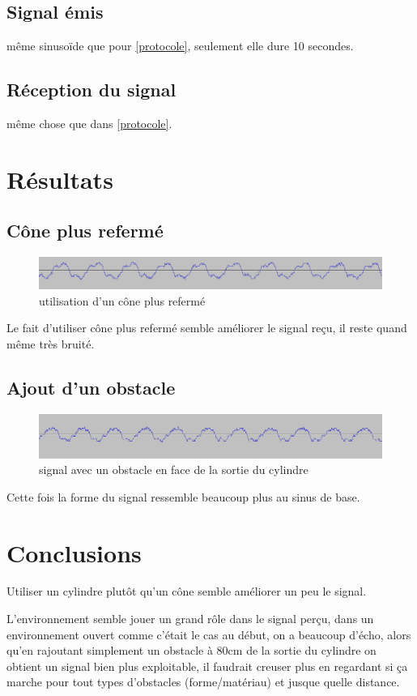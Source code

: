 \subsection{Signal émis}
même sinusoïde que pour \ref{protocole}, seulement elle dure 10 secondes.

\subsection{Réception du signal}
même chose que dans \ref{protocole}.

\section{Résultats}
\subsection{Cône plus refermé}
\begin{figure}[H]
\includegraphics[width=\textwidth]{resources/img/cone_90_plus_fin.png}
\caption{utilisation d'un cône plus refermé}
\end{figure}
Le fait d'utiliser cône plus refermé semble améliorer le signal reçu, il reste quand même très bruité.

\subsection{Ajout d'un obstacle}
\begin{figure}[H]
\includegraphics[width=\textwidth]{resources/img/cone+obstacle.png}
\caption{signal avec un obstacle en face de la sortie du cylindre}
\end{figure}
Cette fois la forme du signal ressemble beaucoup plus au sinus de base.

\section{Conclusions}
Utiliser un cylindre plutôt qu'un cône semble améliorer un peu le signal.

L'environnement semble jouer un grand rôle dans le signal perçu, dans un environnement ouvert comme c'était le cas au début, on a beaucoup d'écho, alors qu'en rajoutant simplement un obstacle à 80cm de la sortie du cylindre  on obtient un signal bien plus exploitable, il faudrait creuser plus en regardant si ça marche pour tout types d'obstacles (forme/matériau) et jusque quelle distance.


